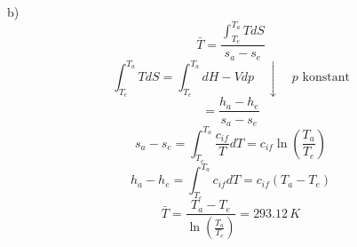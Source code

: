 b) 
\[
\bar{T} = \frac{\int_{T_e}^{T_a} T dS}{s_a - s_e}
\]
\[
\int_{T_e}^{T_a} T dS = \int_{T_e}^{T_a} dH - V dp \quad \downarrow \quad p \text{ konstant}
\]
\[
= \frac{h_a - h_e}{s_a - s_e}
\]
\[
s_a - s_e = \int_{T_e}^{T_a} \frac{c_{if}}{T} dT = c_{if} \ln \left( \frac{T_a}{T_e} \right)
\]
\[
h_a - h_e = \int_{T_e}^{T_a} c_{if} dT = c_{if} (T_a - T_e)
\]
\[
\bar{T} = \frac{T_a - T_e}{\ln \left( \frac{T_a}{T_e} \right)} = 293.12 \, K
\]